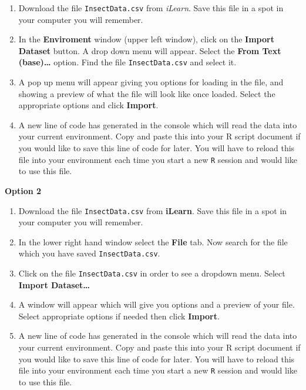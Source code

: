 \documentclass[
]{book}
\begin{document}
\begin{enumerate}
\def\labelenumi{\arabic{enumi})}
\item
  Download the file \texttt{InsectData.csv} from \emph{iLearn}. Save this file in a spot in your computer you will remember.
\item
  In the \textbf{Enviroment} window (upper left window), click on the \textbf{Import Dataset} button. A drop down menu will appear. Select the \textbf{From Text (base)\ldots{}} option. Find the file \texttt{InsectData.csv} and select it.
\item
  A pop up menu will appear giving you options for loading in the file, and showing a preview of what the file will look like once loaded. Select the appropriate options and click \textbf{Import}.
\item
  A new line of code has generated in the console which will read the data into your current environment. Copy and paste this into your R script document if you would like to save this line of code for later. You will have to reload this file into your environment each time you start a new \texttt{R} session and would like to use this file.
\end{enumerate}

\textbf{Option 2}

\begin{enumerate}
\def\labelenumi{\arabic{enumi})}
\item
  Download the file \texttt{InsectData.csv} from \textbf{iLearn}. Save this file in a spot in your computer you will remember.
\item
  In the lower right hand window select the \textbf{File} tab. Now search for the file which you have saved \texttt{InsectData.csv}.
\item
  Click on the file \texttt{InsectData.csv} in order to see a dropdown menu. Select \textbf{Import Dataset\ldots{}}
\item
  A window will appear which will give you options and a preview of your file. Select appropriate options if needed then click \textbf{Import}.
\item
  A new line of code has generated in the console which will read the data into your current environment. Copy and paste this into your R script document if you would like to save this line of code for later. You will have to reload this file into your environment each time you start a new \texttt{R} session and would like to use this file.
\end{enumerate}
\end{document}
